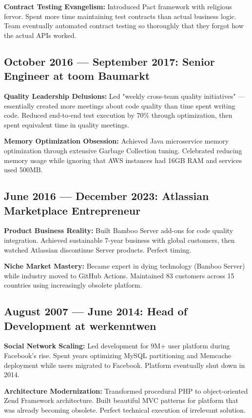 \documentclass[11pt,a4paper]{article}
\begin{document}
\textbf{Contract Testing Evangelism:} Introduced Pact framework with religious fervor. Spent more time maintaining test contracts than actual business logic. Team eventually automated contract testing so thoroughly that they forgot how the actual APIs worked.

\subsection*{October 2016 — September 2017: Senior Engineer at toom Baumarkt}

\textbf{Quality Leadership Delusions:} Led "weekly cross-team quality initiatives" — essentially created more meetings about code quality than time spent writing code. Reduced end-to-end test execution by 70\% through optimization, then spent equivalent time in quality meetings.

\textbf{Memory Optimization Obsession:} Achieved Java microservice memory optimization through extensive Garbage Collection tuning. Celebrated reducing memory usage while ignoring that AWS instances had 16GB RAM and services used 500MB.

\subsection*{June 2016 — December 2023: Atlassian Marketplace Entrepreneur}

\textbf{Product Business Reality:} Built Bamboo Server add-ons for code quality integration. Achieved sustainable 7-year business with global customers, then watched Atlassian discontinue Server products. Perfect timing.

\textbf{Niche Market Mastery:} Became expert in dying technology (Bamboo Server) while industry moved to GitHub Actions. Maintained 83 customers across 15 countries using increasingly obsolete platform.

\subsection*{August 2007 — June 2014: Head of Development at werkenntwen}

\textbf{Social Network Scaling:} Led development for 9M+ user platform during Facebook's rise. Spent years optimizing MySQL partitioning and Memcache deployment while users migrated to Facebook. Platform eventually shut down in 2014.

\textbf{Architecture Modernization:} Transformed procedural PHP to object-oriented Zend Framework architecture. Built beautiful MVC patterns for platform that was already becoming obsolete. Perfect technical execution of irrelevant solution.
\end{document}
